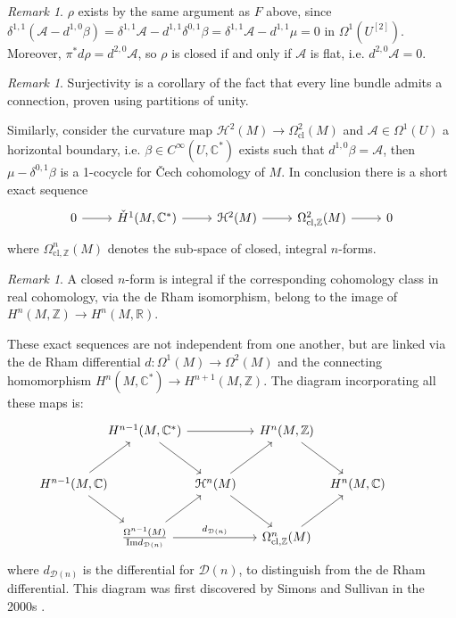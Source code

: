\documentclass[a4paper]{book}
\newcommand{\lA}{\mathcal{A}}
\newcommand{\bC}{\mathbb{C}}
\newcommand{\lD}{\mathcal{D}}
\newcommand{\lH}{\mathcal{H}}
\newcommand{\bR}{\mathbb{R}}
\newcommand{\bZ}{\mathbb{Z}}
\newcommand{\cl}{\mathrm{cl}}
\theoremstyle{definition}
\theoremstyle{remark}
\newtheorem{remark}[equation]{Remark}
\numberwithin{equation}{section}
\begin{document}
\begin{remark}
	$\rho$ exists by the same argument as $F$ above, since $\delta^{1,1}(\lA-d^{1,0}\beta)=\delta^{1,1}\lA-d^{1,1}\delta^{0,1}\beta=\delta^{1,1}\lA-d^{1,1}\mu=0$ in $\Omega^1(U^{[2]})$. Moreover, $\pi^*d\rho=d^{2,0}\lA$, so $\rho$ is closed if and only if $\lA$ is flat, i.e. $d^{2,0}\lA=0$. 
\end{remark}
\begin{remark}
	Surjectivity is a corollary of the fact that every line bundle admits a connection, proven using partitions of unity. 
\end{remark}
Similarly, consider the curvature map $\lH^2(M)\to\Omega^{2}_\cl(M)$ and $\lA\in\Omega^1(U)$ a horizontal boundary, i.e. $\beta\in C^\infty(U,\bC^*)$ exists such that $d^{1,0}\beta=\lA$, then $\mu-\delta^{0,1}\beta$ is a 1-cocycle for \v Cech cohomology of $M$. In conclusion there is a short exact sequence \begin{equation}
	\begin{tikzcd}
		0 \arrow[r] & \check{H}^1(M,\bC^*) \arrow[r] & \lH^2(M) \arrow[r] & \Omega^2_{\cl,\bZ}(M) \arrow[r] & 0 
	\end{tikzcd}
\end{equation}where $\Omega^n_{\cl,\bZ}(M)$ denotes the sub-space of closed, integral $n$-forms.
\begin{remark}
	A closed $n$-form is integral if the corresponding cohomology class in real cohomology, via the de Rham isomorphism, belong to the image of $H^n(M,\bZ)\to H^n(M,\bR)$. 
\end{remark}
These exact sequences are not independent from one another, but are linked via the de Rham differential $d:\Omega^1(M)\to\Omega^2(M)$ and the connecting homomorphism $H^n(M,\bC^*)\to H^{n+1}(M,\bZ)$. The diagram incorporating all these maps is:
\begin{equation}
	\begin{tikzcd}[column sep={2cm,between origins},row sep={1.5cm,between origins}]
            & H^{n-1}(M,\bC^*) \arrow[dr]\arrow[rr] & & H^n(M,\bZ) \arrow[dr] & & \\
            H^{n-1}(M,\bC)\arrow[ru]\arrow[rd] & & \lH^n(M) \arrow[dr]\arrow[ru] & & H^n(M,\bC) & \\
            & \frac{\Omega^{n-1}(M)}{\mathrm{Im}d_{\lD(n)}} \arrow[ru]\arrow[rr,"d_{\lD(n)}"] & & \Omega^n_{\cl,\bZ}(M) \arrow[ru] & & 
        \end{tikzcd}
\end{equation}
where $d_{\lD(n)}$ is the differential for $\lD(n)$, to distinguish from the de Rham differential. This diagram was first discovered by Simons and Sullivan in the 2000s \cite{simonssullivan2008diffcoh}.
\end{document}

